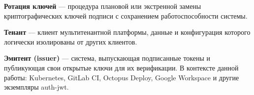 \textbf{Ротация ключей} --- процедура плановой или экстренной замены
криптографических ключей подписи с сохранением работоспособности системы.

\textbf{Тенант} --- клиент мультитенантной платформы,
данные и конфигурация которого логически изолированы от других клиентов.

\textbf{Эмитент (issuer)} --- система, выпускающая подписанные токены
и публикующая свои открытые ключи для их верификации.
В контексте данной работы: Kubernetes, GitLab CI, Octopus Deploy, Google Workspace
и другие экземпляры auth-jwt.
